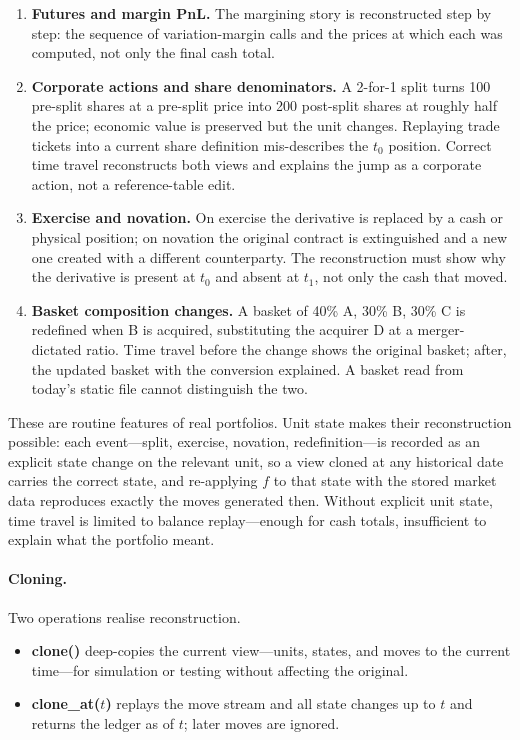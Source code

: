 \begin{enumerate}
\item \textbf{Futures and margin PnL.} The margining story is reconstructed step by step: the sequence of variation-margin calls and the prices at which each was computed, not only the final cash total.
\item \textbf{Corporate actions and share denominators.} A 2-for-1 split turns 100 pre-split shares at a pre-split price into 200 post-split shares at roughly half the price; economic value is preserved but the unit changes. Replaying trade tickets into a current share definition mis-describes the $t_0$ position. Correct time travel reconstructs both views and explains the jump as a corporate action, not a reference-table edit.
\item \textbf{Exercise and novation.} On exercise the derivative is replaced by a cash or physical position; on novation the original contract is extinguished and a new one created with a different counterparty. The reconstruction must show why the derivative is present at $t_0$ and absent at $t_1$, not only the cash that moved.
\item \textbf{Basket composition changes.} A basket of 40\% A, 30\% B, 30\% C is redefined when B is acquired, substituting the acquirer D at a merger-dictated ratio. Time travel before the change shows the original basket; after, the updated basket with the conversion explained. A basket read from today's static file cannot distinguish the two.
\end{enumerate}

These are routine features of real portfolios. Unit state makes their reconstruction possible: each event---split, exercise, novation, redefinition---is recorded as an explicit state change on the relevant unit, so a view cloned at any historical date carries the correct state, and re-applying $f$ to that state with the stored market data reproduces exactly the moves generated then. Without explicit unit state, time travel is limited to balance replay---enough for cash totals, insufficient to explain what the portfolio meant.

\paragraph{Cloning.} Two operations realise reconstruction.

\begin{itemize}[nosep]
\item \textbf{clone()} deep-copies the current view---units, states, and moves to the current time---for simulation or testing without affecting the original.
\item \textbf{clone\_at($t$)} replays the move stream and all state changes up to $t$ and returns the ledger as of $t$; later moves are ignored.
\end{itemize}

